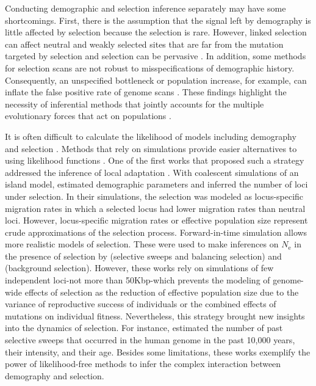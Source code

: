 \documentclass[a4paper, 12pt]{article}
\begin{document}
Conducting demographic and selection inference separately may have some shortcomings. First, there is the assumption that the signal left by demography is little affected by selection because the selection is rare. However, linked selection can affect neutral and weakly selected sites that are far from the mutation targeted by selection \citep{Sella:2009hs, Neher:2013ju} and selection can be pervasive \citep{Sella:2009hs, Lange:2018fl}. In addition, some methods for selection scans are not robust to misspecifications of demographic history. Consequently, an unspecified bottleneck or population increase, for example, can inflate the false positive rate of genome scans \citep{Jensen:2005ky, Jensen:2007jw, Schrider:2016gg}. These findings highlight the necessity of inferential methods that jointly accounts for the multiple evolutionary forces that act on populations \citep{Lin:2011jv, Li:2012bh, Bank:2014hx}. 
 
It is often difficult to calculate the likelihood of models including demography and selection \citep[but see][]{Vitalis:2014ja}. Methods that rely on simulations provide easier alternatives to using likelihood functions \citep{Csillery:2010jd, Schrider:2018ei}. One of the first works that proposed such a strategy addressed the inference of local adaptation \citep{Bazin:2010dv}. With coalescent simulations of an island model, \citet{Bazin:2010dv} estimated demographic parameters and inferred the number of loci under selection. In their simulations, the selection was modeled as locus-specific migration rates in which a selected locus had lower migration rates than neutral loci. However, locus-specific migration rates or effective population size \citep[as in][]{Roux:2016gm, Fraisse:2021gg} represent crude approximations of the selection process. Forward-in-time simulation allows more realistic models of selection. These were used to make inferences on $N_\mathrm{e}$ in the presence of selection by \citet{Sheehan:2016caa} (selective sweeps and balancing selection) and \citet{Johri:2020ee} (background selection). However, these works rely on simulations of few independent loci-not more than 50Kbp-which prevents the modeling of genome-wide effects of selection as the reduction of effective population size due to the variance of reproductive success of individuals \citep{Santiago:1995wx} or the combined effects of mutations on individual fitness.
Nevertheless, this strategy brought new insights into the dynamics of selection. For instance, \citet{Laval:2019jo} estimated the number of past selective sweeps that occurred in the human genome in the past 10,000 years, their intensity, and their age. Besides some limitations, these works exemplify the power of likelihood-free methods to infer the complex interaction between demography and selection.
\end{document}

